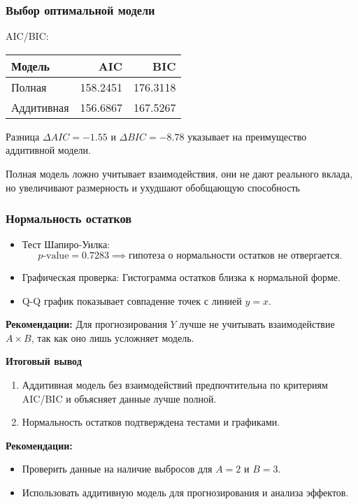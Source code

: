 \documentclass[12pt]{spbstu-task}
\begin{document}
\subsubsection{Выбор оптимальной модели}
\label{sec:org980c163}
AIC/BIC:
\begin{table}[H]
  \centering
  \begin{tabular}{lrr} \toprule
    Модель & AIC & BIC \\ \midrule
    Полная & 158.2451 & 176.3118 \\
    Аддитивная & 156.6867 & 167.5267 \\ \bottomrule
  \end{tabular}
\end{table}

Разница \(\Delta AIC = -1.55\) и \(\Delta BIC = -8.78\) указывает на
преимущество аддитивной модели.

Полная модель ложно учитывает взаимодействия, они не дают реального
вклада, но увеличивают размерность и ухудшают обобщающую способность
\subsubsection{Нормальность остатков}
\label{sec:orgb6b0507}
\begin{itemize}
\item Тест Шапиро-Уилка: \[p\text{-value} = 0.7283 \implies \text{гипотеза
  о нормальности остатков не отвергается}.\]
\item Графическая проверка: Гистограмма остатков близка к нормальной
форме.
\item Q-Q график показывает совпадение точек с линией \(y = x\).
\end{itemize}

\textbf{Рекомендации:} Для прогнозирования \(Y\) лучше не учитывать
взаимодействие \(A \times B\), так как оно лишь усложняет модель.

\textbf{Итоговый вывод}
\begin{enumerate}
\item Аддитивная модель без взаимодействий предпочтительна по критериям
AIC/BIC и объясняет данные лучше полной.
\item Нормальность остатков подтверждена тестами и графиками.
\end{enumerate}

\textbf{Рекомендации:}
\begin{itemize}
\item Проверить данные на наличие выбросов для \(A=2\) и \(B=3\).
\item Использовать аддитивную модель для прогнозирования и анализа
эффектов.
\end{itemize}
\end{document}
